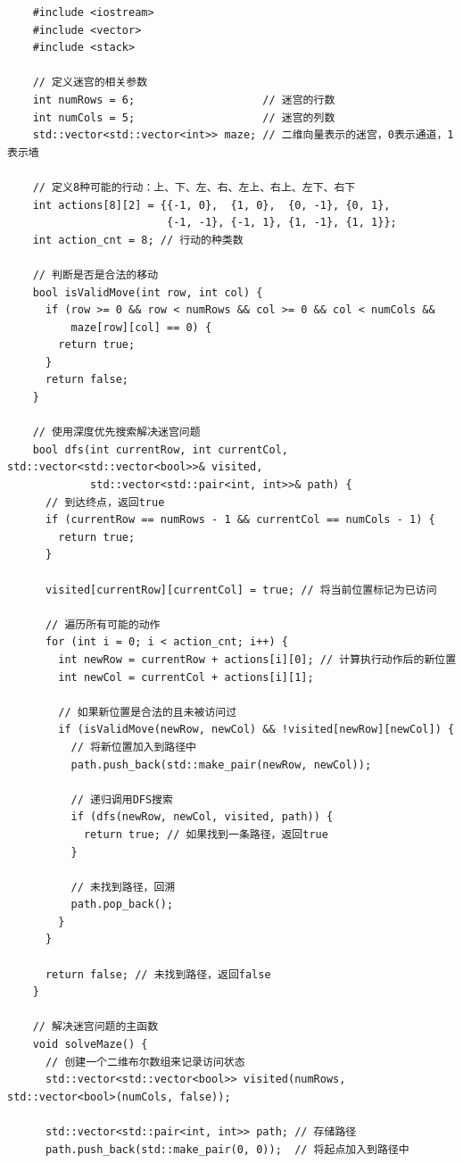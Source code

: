 \documentclass[UTF8,titlepage]{ctexart}
\numberwithin{figure}{section}
\begin{document}
\begin{verbatim}
    #include <iostream>
    #include <vector>
    #include <stack>
    
    // 定义迷宫的相关参数
    int numRows = 6;                    // 迷宫的行数
    int numCols = 5;                    // 迷宫的列数
    std::vector<std::vector<int>> maze; // 二维向量表示的迷宫，0表示通道，1表示墙
    
    // 定义8种可能的行动：上、下、左、右、左上、右上、左下、右下
    int actions[8][2] = {{-1, 0},  {1, 0},  {0, -1}, {0, 1},
                         {-1, -1}, {-1, 1}, {1, -1}, {1, 1}};
    int action_cnt = 8; // 行动的种类数
    
    // 判断是否是合法的移动
    bool isValidMove(int row, int col) {
      if (row >= 0 && row < numRows && col >= 0 && col < numCols &&
          maze[row][col] == 0) {
        return true;
      }
      return false;
    }
    
    // 使用深度优先搜索解决迷宫问题
    bool dfs(int currentRow, int currentCol, std::vector<std::vector<bool>>& visited,
             std::vector<std::pair<int, int>>& path) {
      // 到达终点，返回true
      if (currentRow == numRows - 1 && currentCol == numCols - 1) {
        return true;
      }
    
      visited[currentRow][currentCol] = true; // 将当前位置标记为已访问
    
      // 遍历所有可能的动作
      for (int i = 0; i < action_cnt; i++) {
        int newRow = currentRow + actions[i][0]; // 计算执行动作后的新位置
        int newCol = currentCol + actions[i][1];
    
        // 如果新位置是合法的且未被访问过
        if (isValidMove(newRow, newCol) && !visited[newRow][newCol]) {
          // 将新位置加入到路径中
          path.push_back(std::make_pair(newRow, newCol));
    
          // 递归调用DFS搜索
          if (dfs(newRow, newCol, visited, path)) {
            return true; // 如果找到一条路径，返回true
          }
    
          // 未找到路径，回溯
          path.pop_back();
        }
      }
    
      return false; // 未找到路径，返回false
    }
    
    // 解决迷宫问题的主函数
    void solveMaze() {
      // 创建一个二维布尔数组来记录访问状态
      std::vector<std::vector<bool>> visited(numRows, std::vector<bool>(numCols, false));
    
      std::vector<std::pair<int, int>> path; // 存储路径
      path.push_back(std::make_pair(0, 0));  // 将起点加入到路径中
    

\end{verbatim}
\end{document}
